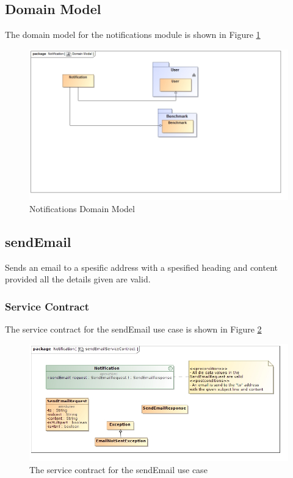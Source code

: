 \subsection{Domain Model}
The domain model for the notifications module is shown in Figure \ref{Notifications Domain Model}
\begin{figure}[H]
	\begin{center}
		\includegraphics[scale=0.5]{../Diagrams and Charts/Notifications/Domain Model.jpg}  
		\caption{Notifications Domain Model}
		\label{Notifications Domain Model}
	\end{center}	
\end{figure}

\subsection{sendEmail}
Sends an email to a spesific address with a spesified heading and content
provided all the details given are valid.

\subsubsection{Service Contract}
The service contract for the sendEmail use case is shown in Figure \ref{sendEmailServiceContract}
\begin{figure}[H]
	\begin{center}
		\includegraphics[scale=0.5]{../Diagrams and Charts/Notifications/sendEmailServiceContract.jpg}
		\caption{The service contract for the sendEmail use case}
		\label{sendEmailServiceContract}
	\end{center}	
\end{figure}

